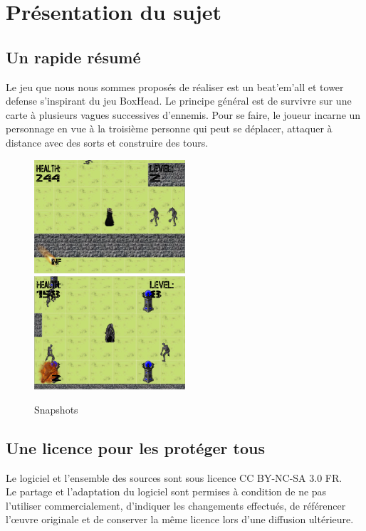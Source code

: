 \section{Présentation du sujet} %

\subsection{Un rapide résumé}
Le jeu que nous nous sommes proposés de réaliser est un beat’em’all et tower defense s’inspirant du jeu BoxHead. Le
principe général est de survivre sur une carte à plusieurs vagues successives d’ennemis. Pour se faire,
le joueur incarne un personnage en vue à la troisième personne qui peut se déplacer, attaquer à distance avec des sorts 
et construire des tours.

\begin{figure}[!ht]
    \includegraphics[width=0.5\textwidth]{./images/snapshot1.png}
    \includegraphics[width=0.5\textwidth]{./images/snapshot2.png}
    \caption{Snapshots}
\end{figure}

\subsection{Une licence pour les protéger tous}

Le logiciel et l'ensemble des sources sont sous licence CC BY-NC-SA 3.0 FR. \\
Le partage et l'adaptation du logiciel sont permises à condition de ne pas l'utiliser
commercialement, d'indiquer les changements effectués, de référencer l’œuvre originale et 
de conserver la même licence lors d'une diffusion ultérieure.

